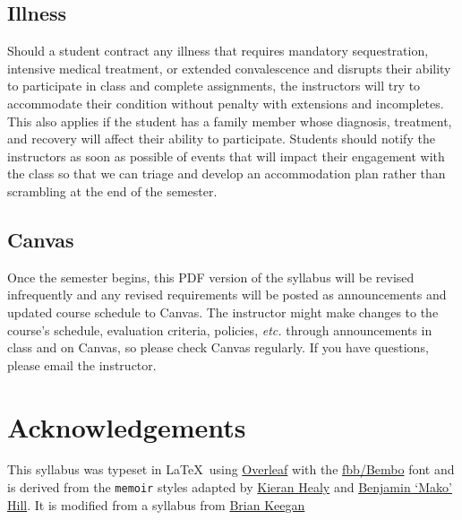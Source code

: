 \documentclass[10pt]{memoir}
\begin{document}
\subsection{Illness}
Should a student contract any illness that requires mandatory sequestration, intensive medical treatment, or extended convalescence and disrupts their ability to participate in class and complete assignments, the instructors will try to accommodate their condition without penalty with extensions and incompletes. This also applies if the student has a family member whose diagnosis, treatment, and recovery will affect their ability to participate. Students should notify the instructors as soon as possible of events that will impact their engagement with the class so that we can triage and develop an accommodation plan rather than scrambling at the end of the semester.



\subsection{Canvas}
Once the semester begins, this PDF version of the syllabus will be revised infrequently and any revised requirements will be posted as announcements and updated course schedule to Canvas. The instructor might make changes to the course's schedule, evaluation criteria, policies, \textit{etc.} through announcements in class and on Canvas, so please check Canvas regularly. If you have questions, please email the instructor.

\section{\textbf{Acknowledgements}}

This syllabus was typeset in \LaTeX~using \href{http://www.sharelatex.com}{Overleaf} with the \href{http://www.tug.dk/FontCatalogue/fbb/}{fbb/Bembo} font and is derived from the \texttt{memoir} styles adapted by \href{https://github.com/kjhealy/latex-custom-kjh}{Kieran Healy} and \href{http://projects.mako.cc/source/?p=latex_mako;a=summary}{Benjamin `Mako' Hill}. It is modified from a syllabus from \href{https://www.brianckeegan.com/}{Brian Keegan} 



\renewcommand{\bibsection}{\section{\huge \bibname}\prebibhook}
\baselineskip 14.2pt

\end{document}
